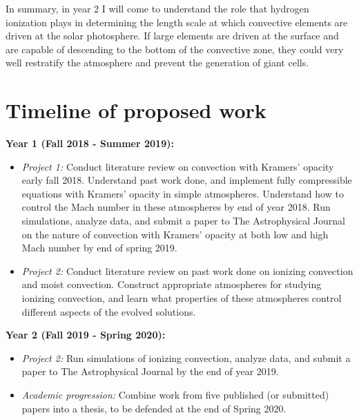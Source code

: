 \documentclass[aasms,12pt]{article}
\begin{document}
In summary, in year 2 I will come to understand the role that hydrogen ionization plays in determining
the length scale at which convective elements are driven at the solar photosphere.
If large elements are driven at the surface and are capable of
descending to the bottom of the convective zone, they could very
well restratify the atmosphere and prevent the generation of giant cells.


\vspace{-0.2cm}
\section{Timeline of proposed work}
\vspace{-0.2cm}
\textbf{Year 1 (Fall 2018 - Summer 2019):}
\begin{itemize}
\vspace{-0.2cm}
\item \emph{Project 1:} Conduct literature review on convection with Kramers' opacity early fall 2018.  
Understand past work done, and implement fully compressible equations with Kramers'
opacity in simple atmospheres.  Understand how to control the Mach number in these
atmospheres by end of year 2018.  Run simulations, analyze data, and submit a paper to The Astrophysical Journal
on the nature of convection with Kramers' opacity at both low and high Mach number by
end of spring 2019.
\vspace{-0.2cm}
\item \emph{Project 2:} Conduct literature review on past work done on ionizing convection and moist convection.
Construct appropriate atmospheres for studying ionizing convection, and learn what properties of
these atmospheres control different aspects of the evolved solutions.
\end{itemize}

\vspace{-0.2cm}
\noindent
\textbf{Year 2 (Fall 2019 - Spring 2020):}
\begin{itemize}
\vspace{-0.2cm}
\item  \emph{Project 2:} Run simulations of ionizing convection, analyze data, and submit a paper to The
Astrophysical Journal by the end of year 2019.
\vspace{-0.2cm}
\item \emph{Academic progression:} Combine work from five published (or submitted) papers into a thesis, to be defended at the end of 
Spring 2020.
\end{itemize}
\end{document}
